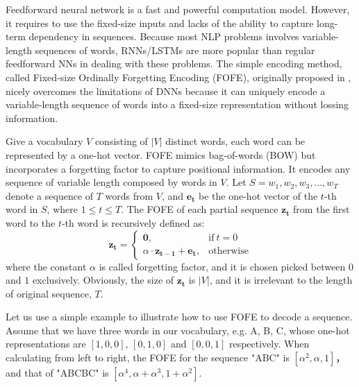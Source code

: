 \documentclass[11pt,a4paper]{article}
\begin{document}
Feedforward neural network is a fast and powerful computation model. 
However, it requires to use the fixed-size inputs and 
lacks of the ability to capture long-term dependency in sequences. 
Because most NLP problems involves variable-length sequences of words, 
RNNs/LSTMs are more popular than regular feedforward NNs in dealing with these problems. 
The simple encoding method, called Fixed-size Ordinally Forgetting Encoding (FOFE), 
originally proposed in \cite{zhang2015fixed}, nicely overcomes the limitations of DNNs because it 
can uniquely encode a variable-length sequence of words into a fixed-size representation without lossing information. 

Give a vocabulary $V$ consisting of $|V|$ distinct words, each word can be represented by a one-hot vector. 
FOFE mimics bag-of-words (BOW) but incorporates a forgetting factor to capture positional information.
It encodes any sequence of variable length composed by words in $V$. 
Let $S = {w_1, w_2, w_3, ... , w_T}$ denote a sequence of $T$ words from $V$, 
and $\bm{e_t}$ be the one-hot vector of the $t$-th word in $S$, where $1 \leq t \leq T$.
The FOFE of each partial sequence $\bm{z_t}$ from the first word to the $t$-th word is recursively defined as:
\begin{equation}
\bm{z_t}=
\begin{cases}
\bm{0}, & \text{if}\ t = 0 \\
\alpha \cdot \bm{z_{t - 1}} + \bm{e_t}, & \text{otherwise}
\end{cases}  \label{eq_FOFE_formula}
\end{equation}
where the constant $\alpha$ is called forgetting factor, and it is chosen picked between $0$ and $1$ exclusively. 
Obviously, the size of $\bm{z_t}$ is $|V|$, and it is irrelevant to the length of original sequence, $T$.

Let us use a simple example to illustrate how to use FOFE to decode a sequence. Assume that we 
have three words in our vocabulary, e.g. A, B, C, 
whose one-hot representations are $[1, 0, 0]$, $[0, 1, 0]$ and $[0, 0, 1]$ respectively. 
When calculating from left to right, the FOFE for the sequence "ABC" is $[{\alpha}^2, {\alpha}, 1]$， 
and that of "ABCBC" is $[{\alpha}^4, {\alpha} + {\alpha}^3, 1 + {\alpha}^2]$.
\end{document}
